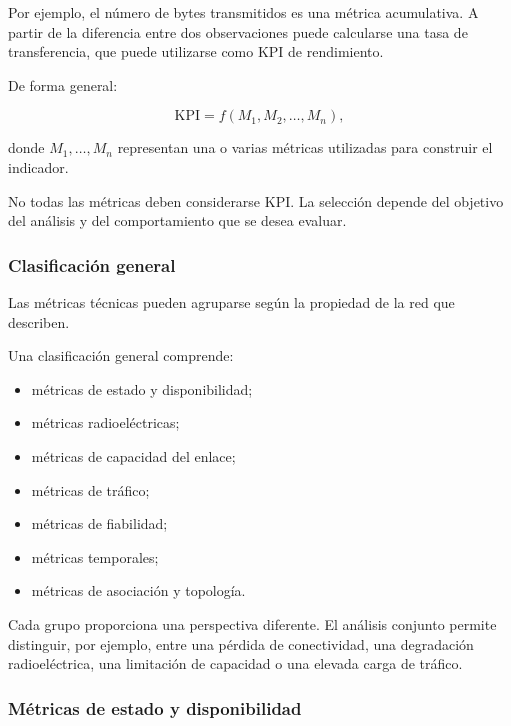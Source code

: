 Por ejemplo, el número de bytes transmitidos es una métrica acumulativa.
A partir de la diferencia entre dos observaciones puede calcularse una
tasa de transferencia, que puede utilizarse como KPI de rendimiento.

De forma general:

\[
    \text{KPI}
    =
    f
    \left(
        M_1,
        M_2,
        \ldots,
        M_n
    \right),
\]

donde \(M_1,\ldots,M_n\) representan una o varias métricas utilizadas
para construir el indicador.

No todas las métricas deben considerarse KPI. La selección depende del
objetivo del análisis y del comportamiento que se desea evaluar.


\subsubsection*{Clasificación general}

Las métricas técnicas pueden agruparse según la propiedad de la red que
describen.

Una clasificación general comprende:

\begin{itemize}
    \item métricas de estado y disponibilidad;

    \item métricas radioeléctricas;

    \item métricas de capacidad del enlace;

    \item métricas de tráfico;

    \item métricas de fiabilidad;

    \item métricas temporales;

    \item métricas de asociación y topología.
\end{itemize}

Cada grupo proporciona una perspectiva diferente. El análisis conjunto
permite distinguir, por ejemplo, entre una pérdida de conectividad, una
degradación radioeléctrica, una limitación de capacidad o una elevada
carga de tráfico.


\subsubsection*{Métricas de estado y disponibilidad}

